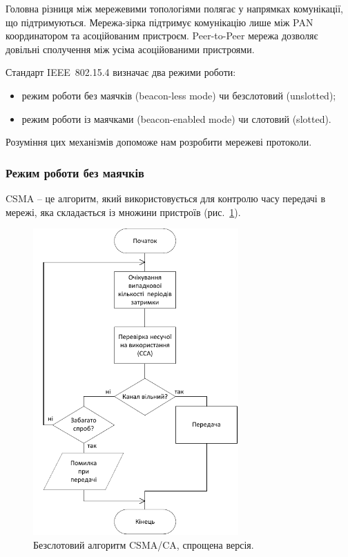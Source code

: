 \documentclass[a4paper,ukrainian,utf8,nocolumnsxix,floatsection,equationsection]{eskdtext}
\renewcommand\paragraph{\subsubsection}
\newcommand{\figref}[1]{рис.~\ref{#1}}
\newcommand{\iee}[0]{IEEE~802.15.4\xspace}
\newcommand{\csma}[0]{CSMA/CA\xspace}
\begin{document}
Головна різниця між мережевими топологіями полягає у напрямках комунікації, що підтримуються. Мережа-зірка підтримує комунікацію лише між PAN координатором та асоційованим пристроєм. Peer-to-Peer мережа дозволяє довільні сполучення між усіма асоційованими пристроями.

Стандарт \iee визначає два режими роботи:
\begin{itemize}
	\item режим роботи без маячків (beacon-less mode) чи безслотовий (unslotted);
	\item режим роботи із маячками (beacon-enabled mode) чи слотовий (slotted).
\end{itemize}

Розуміння цих механізмів допоможе нам розробити мережеві протоколи.


\paragraph{Режим роботи без маячків}

CSMA – це алгоритм, який використовується для контролю часу передачі в мережі, яка складається із множини пристроїв (\figref{fig:csma-ca}).

\begin{figure}[bth]
	\centering
	\includegraphics[width=0.7\textwidth]{img/csma-ca.pdf}
	\caption{\label{fig:csma-ca}Безслотовий алгоритм \csma, спрощена версія.}
\end{figure}
\end{document}
